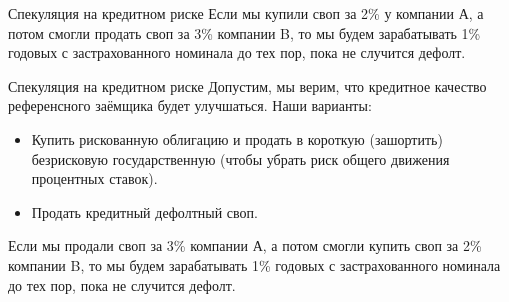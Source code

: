 \documentclass{beamer}
\begin{document}
\newcommand{\paymentFlow}[4] {
	\draw [
		->,
		>=triangle 90
	]
	(#1) -- (#2)
	node[
		pos = 0.5,
		anchor = #4
	]
	{#3};
}

\begin{frame}{Спекуляция на кредитном риске}
\justify
Если мы купили своп за 2\% у компании А, а потом смогли продать своп за 3\% компании B, то мы будем зарабатывать 1\% годовых с застрахованного номинала до тех пор, пока не случится дефолт.

\justify
\centering
{}
\end{frame}



\begin{frame}{Спекуляция на кредитном риске}
\justify
Допустим, мы верим, что кредитное качество референсного заёмщика будет улучшаться. Наши варианты:
\begin{itemize}
\justifying
\item Купить рискованную облигацию и продать в короткую (зашортить) безрисковую государственную (чтобы убрать риск общего движения процентных ставок).
\item Продать кредитный дефолтный своп.
\end{itemize}

\justify
Если мы продали своп за 3\% компании А, а потом смогли купить своп за 2\% компании B, то мы будем зарабатывать 1\% годовых с застрахованного номинала до тех пор, пока не случится дефолт.
\end{frame}
\end{document}
